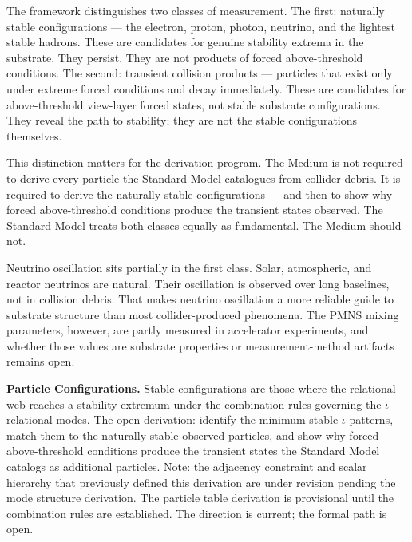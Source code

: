 \documentclass[11pt,letterpaper]{article}
\begin{document}
The framework distinguishes two classes of measurement. The first: naturally stable configurations --- the electron, proton, photon, neutrino, and the lightest stable hadrons. These are candidates for genuine stability extrema in the substrate. They persist. They are not products of forced above-threshold conditions. The second: transient collision products --- particles that exist only under extreme forced conditions and decay immediately. These are candidates for above-threshold view-layer forced states, not stable substrate configurations. They reveal the path to stability; they are not the stable configurations themselves.

This distinction matters for the derivation program. The Medium is not required to derive every particle the Standard Model catalogues from collider debris. It is required to derive the naturally stable configurations --- and then to show why forced above-threshold conditions produce the transient states observed. The Standard Model treats both classes equally as fundamental. The Medium should not.

Neutrino oscillation sits partially in the first class. Solar, atmospheric, and reactor neutrinos are natural. Their oscillation is observed over long baselines, not in collision debris. That makes neutrino oscillation a more reliable guide to substrate structure than most collider-produced phenomena. The PMNS mixing parameters, however, are partly measured in accelerator experiments, and whether those values are substrate properties or measurement-method artifacts remains open.

\textbf{Particle Configurations.} Stable configurations are those where the relational web reaches a stability extremum under the combination rules governing the \(\iota\) relational modes. The open derivation: identify the minimum stable \(\iota\) patterns, match them to the naturally stable observed particles, and show why forced above-threshold conditions produce the transient states the Standard Model catalogs as additional particles. Note: the adjacency constraint and scalar hierarchy that previously defined this derivation are under revision pending the mode structure derivation. The particle table derivation is provisional until the combination rules are established. The direction is current; the formal path is open.
\end{document}
